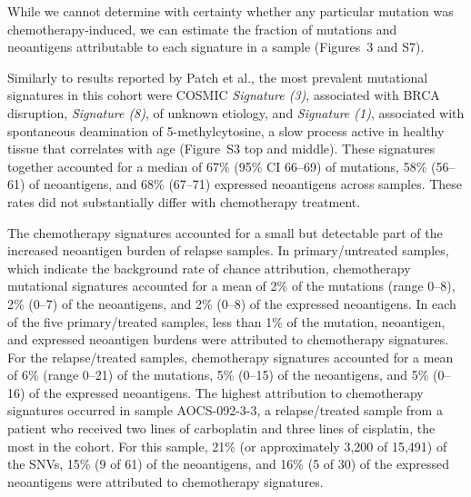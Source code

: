 \documentclass[linenumbers]{bmcart}
\begin{document}

While we cannot determine with certainty whether any particular mutation was chemotherapy-induced, we can estimate the fraction of mutations and neoantigens attributable to each signature in a sample (Figures~3 and S7).

Similarly to results reported by Patch et al., the most prevalent mutational signatures in this cohort were COSMIC \textit{Signature (3)}, associated with BRCA disruption, \textit{Signature (8)}, of unknown etiology, and \textit{Signature (1)}, associated with spontaneous deamination of 5-methylcytosine, a slow process active in healthy tissue that correlates with age (Figure~S3 top and middle). These signatures together accounted for a median of 67\% (95\% CI 66--69) of mutations, 58\% (56--61) of neoantigens, and 68\% (67--71) expressed neoantigens across samples. These rates did not substantially differ with chemotherapy treatment.

The chemotherapy signatures accounted for a small but detectable part of the increased neoantigen burden of relapse samples. In primary/untreated samples, which indicate the background rate of chance attribution, chemotherapy mutational signatures accounted for a mean of 2\% of the mutations (range 0--8), 2\% (0--7) of the neoantigens, and 2\% (0--8) of the expressed neoantigens. In each of the five primary/treated samples, less than 1\% of the mutation, neoantigen, and expressed neoantigen burdens were attributed to chemotherapy signatures. For the relapse/treated samples, chemotherapy signatures accounted for a mean of 6\% (range 0--21) of the mutations, 5\% (0--15) of the neoantigens, and 5\% (0--16) of the expressed neoantigens. The highest attribution to chemotherapy signatures occurred in sample AOCS-092-3-3, a relapse/treated sample from a patient who received two lines of carboplatin and three lines of cisplatin, the most in the cohort. For this sample, 21\% (or approximately 3,200 of 15,491) of the SNVs, 15\% (9 of 61) of the neoantigens, and 16\% (5 of 30) of the expressed neoantigens were attributed to chemotherapy signatures.
\end{document}
